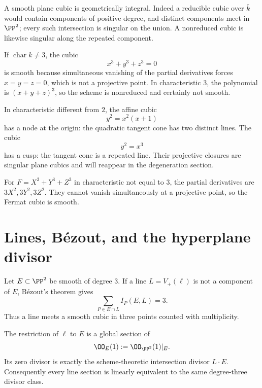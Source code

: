 A smooth plane cubic is geometrically integral.  Indeed a reducible cubic over \(\bar k\) would contain components of positive degree, and distinct components meet in \(\PP^2\); every such intersection is singular on the union.  A nonreduced cubic is likewise singular along the repeated component.

\begin{example}
If \(\operatorname{char}k\neq3\), the cubic
\[
  x^3+y^3+z^3=0
\]
is smooth because simultaneous vanishing of the partial derivatives forces \(x=y=z=0\), which is not a projective point.  In characteristic \(3\), the polynomial is \((x+y+z)^3\), so the scheme is nonreduced and certainly not smooth.
\end{example}

\begin{example}
In characteristic different from \(2\), the affine cubic
\[
  y^2=x^2(x+1)
\]
has a node at the origin: the quadratic tangent cone has two distinct lines.  The cubic
\[
  y^2=x^3
\]
has a cusp: the tangent cone is a repeated line.  Their projective closures are singular plane cubics and will reappear in the degeneration section.
\end{example}



\begin{example}\label{ex:vi43-expand-01}
For $F=X^3+Y^3+Z^3$ in characteristic not equal to $3$, the partial derivatives are $3X^2,3Y^2,3Z^2$.  They cannot vanish simultaneously at a projective point, so the Fermat cubic is smooth.
\end{example}
\section{Lines, B\'ezout, and the hyperplane divisor}

Let \(E\subset\PP^2\) be smooth of degree \(3\).  If a line \(L=V_+(\ell)\) is not a component of \(E\), B\'ezout's theorem gives
\[
  \sum_{P\in E\cap L} I_P(E,L)=3.
\]
Thus a line meets a smooth cubic in three points counted with multiplicity.

The restriction of \(\ell\) to \(E\) is a global section of
\[
  \OO_E(1):=\OO_{\PP^2}(1)|_E.
\]
Its zero divisor is exactly the scheme-theoretic intersection divisor \(L\cdot E\).  Consequently every line section is linearly equivalent to the same degree-three divisor class.

